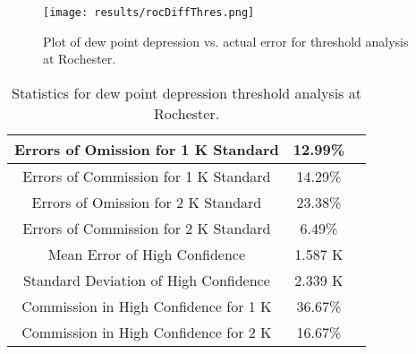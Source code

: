 \documentclass{book}
\begin{document}
\begin{minipage}[c]{0.47\textwidth}
\centering
\begin{figure}[H]
\texttt{[image: results/rocDiffThres.png]}
\caption{Plot of dew point depression vs. actual error for threshold analysis at Rochester.}
\label{fig:rocDiffThres}
\end{figure}
\end{minipage}
\begin{minipage}[c]{0.47\textwidth}
\begin{table}[H]
\centering
\footnotesize
\begin{tabular}{ | c | c | c | } \hline
Errors of Omission for 1 K Standard & 12.99\% \\ \hline
Errors of Commission for 1 K Standard & 14.29\% \\ \hline
Errors of Omission for 2 K Standard & 23.38\% \\ \hline
Errors of Commission for 2 K Standard & 6.49\% \\ \hline
Mean Error of High Confidence & 1.587 K \\ \hline
Standard Deviation of High Confidence & 2.339 K \\ \hline
Commission in High Confidence for 1 K & 36.67\% \\ \hline
Commission in High Confidence for 2 K & 16.67\% \\ \hline
\end{tabular}
\caption{Statistics for dew point depression threshold analysis at Rochester.}
\label{tab:rocDiffThres}
\end{table}
\end{minipage}
\end{document}
